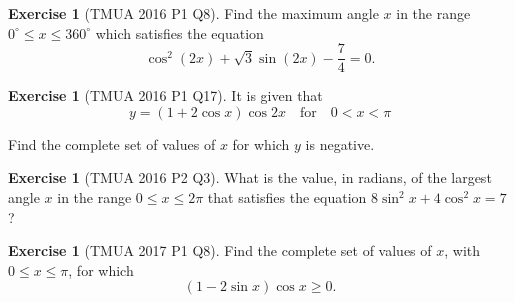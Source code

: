\documentclass[11pt]{article}
\theoremstyle{definition}
\newtheorem{example}[theorem]{Exercise}
\theoremstyle{remark}
\newcommand{\pqty}[1]{\left(#1\right)}
\newcommand{\degree}{^{\circ}}
\newcommand{\qfor}{\quad\text{for}\quad}
\begin{document}
\begin{example}[TMUA 2016 P1 Q8]\label{tmua-2-unit-021}
    Find the maximum angle \(x\) in the range \(0\degree \leq x \leq 360\degree\) which satisfies the equation
    \[
        \cos^2 \pqty{2x} + \sqrt{3} \sin \pqty{2x} - \frac{7}{4} = 0.
    \]
\end{example}

\begin{example}[TMUA 2016 P1 Q17]\label{tmua-2-unit-022}
    It is given that
    \[
        y = \pqty{1 + 2 \cos x} \cos 2x \qfor 0 < x < \pi
    \]

    Find the complete set of values of \(x\) for which \(y\) is negative.
\end{example}

\begin{example}[TMUA 2016 P2 Q3]\label{tmua-2-unit-023}
    What is the value, in radians, of the largest angle \(x\) in the range \(0 \leq x \leq 2\pi\) that satisfies the equation \(8 \sin^2 x + 4 \cos^2 x = 7\)?
\end{example}

\begin{example}[TMUA 2017 P1 Q8]\label{tmua-2-unit-024}
    Find the complete set of values of \(x\), with \(0 \leq x \leq \pi\), for which
    \[
        \pqty{1 - 2 \sin x} \cos x \geq 0.
    \]
\end{example}
\end{document}
